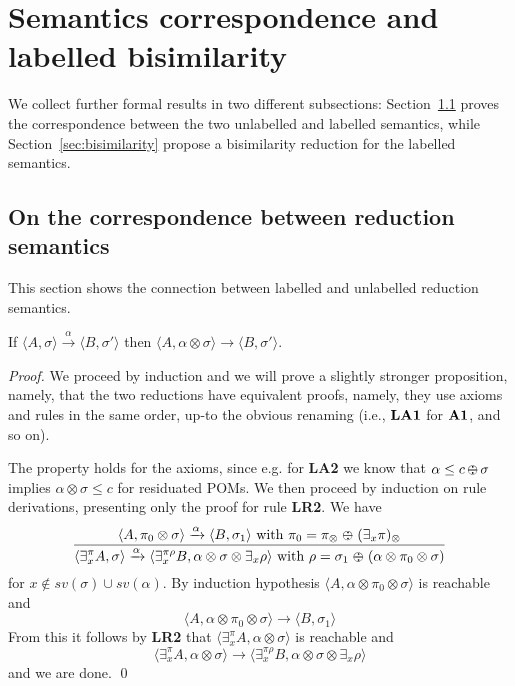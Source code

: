 \documentclass{llncs}
\def\C{{\mathcal C}}
\def\C{{\mathcal C}}
\def\odiv{\, {\ominus\hspace{-7.7pt} \div} \,}
\begin{document}
\section{Semantics correspondence and labelled bisimilarity}\label{sec:correspondancebis}
We collect further formal results in two different subsections: Section~\ref{sec:corres} proves the correspondence between the two unlabelled and labelled semantics, while Section~\ref{sec:bisimilarity} propose a bisimilarity reduction for the labelled  semantics.

\subsection{On the correspondence between reduction semantics}
\label{sec:corres}
This section shows the connection between labelled and unlabelled reduction semantics.
%

\begin{theorem}[Soundness]
\label{sound}
If $\langle A, \sigma \rangle \xrightarrow{\alpha} \langle B, \sigma' \rangle$
then %
$\langle A, \alpha \otimes \sigma \rangle \to \langle B, \sigma' \rangle$.
\end{theorem}
\begin{proof}
	We proceed by induction and we will prove a slightly stronger proposition, namely, that the two reductions
	have equivalent proofs, namely, they use axioms and rules in the same order,
	up-to the obvious renaming (i.e., ${\bf LA1}$ for ${\bf A1}$, and so on).
	
	The property holds for the axioms, since e.g. for {\bf LA2} we know that
	$\alpha \leq c \odiv \sigma$ implies $\alpha \otimes \sigma \leq c$ for residuated POMs.
	We then proceed by induction on rule derivations,
	presenting only the proof for rule {\bf LR2}.
	We have 
	$$\frac {\displaystyle \langle A, \pi_0 \otimes \sigma \rangle \xrightarrow{\alpha}
		\langle B, \sigma_1 \rangle \text{ with } \pi_0 = \pi_\otimes \; {\ominus\hspace{-7.5pt} \div} \; (\exists_x \pi)_\otimes }
	{\displaystyle \langle \exists^\pi_x A, \sigma \rangle \xrightarrow{\alpha}
		\langle \exists^{\pi \rho}_x B, \alpha \otimes \sigma \otimes \exists_x \rho \rangle  \text{ with } \rho = \sigma_1 \; {\ominus\hspace{-7.5pt} \div} \; (\alpha \otimes \pi_0 \otimes \sigma)}$$
	for $x \not \in sv(\sigma) \cup sv(\alpha)$.
	By induction hypothesis $\langle A, \alpha \otimes \pi_0 \otimes \sigma \rangle$ is reachable and
	$$\langle A, \alpha \otimes \pi_0 \otimes \sigma \rangle \to
	\langle B, \sigma_1 \rangle$$
	From this it follows by {\bf LR2} that $\langle \exists^\pi_x A, \alpha \otimes \sigma \rangle$ is reachable and
	$$\langle \exists^\pi_x A, \alpha \otimes \sigma \rangle \to
	\langle \exists^{\pi \rho}_x B, \alpha \otimes \sigma \otimes \exists_x \rho \rangle$$
	and we are done.
	\qed
\end{proof}
\end{document}
